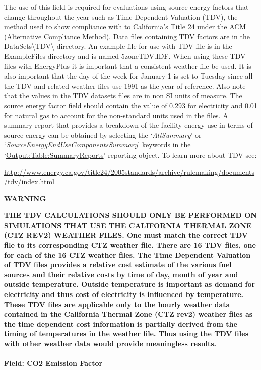 The use of this field is required for evaluations using source energy factors that change throughout the year such as Time Dependent Valuation (TDV), the method used to show compliance with to California's Title 24 under the ACM (Alternative Compliance Method). Data files containing TDV factors are in the DataSets\textbackslash{}TDV\textbackslash{} directory. An example file for use with TDV file is in the ExampleFiles directory and is named 5zoneTDV.IDF. When using these TDV files with EnergyPlus it is important that a consistent weather file be used. It is also important that the day of the week for January 1 is set to Tuesday since all the TDV and related weather files use 1991 as the year of reference. Also note that the values in the TDV datasets files are in non SI units of measure. The source energy factor field should contain the value of 0.293 for electricity and 0.01 for natural gas to account for the non-standard units used in the files. A summary report that provides a breakdown of the facility energy use in terms of source energy can be obtained by selecting the `\emph{AllSummary}' or `\emph{SourceEnergyEndUseComponentsSummary}' keywords in the `\hyperref[outputtablesummaryreports]{Output:Table:SummaryReports}' reporting object. To learn more about TDV see:

\url{http://www.energy.ca.gov/title24/2005standards/archive/rulemaking/documents/tdv/index.html}

\textbf{WARNING}

\textbf{THE TDV CALCULATIONS SHOULD ONLY BE PERFORMED ON SIMULATIONS THAT USE THE CALIFORNIA THERMAL ZONE (CTZ REV2) WEATHER FILES. One must match the correct TDV file to its corresponding CTZ weather file. There are 16 TDV files, one for each of the 16 CTZ weather files. The Time Dependent Valuation of TDV files provides a relative cost estimate of the various fuel sources and their relative costs by time of day, month of year and outside temperature. Outside temperature is important as demand for electricity and thus cost of electricity is influenced by temperature. These TDV files are applicable only to the hourly weather data contained in the California Thermal Zone (CTZ rev2) weather files as the time dependent cost information is partially derived from the timing of temperatures in the weather file. Thus using the TDV files with other weather data would provide meaningless results.}

\paragraph{Field: CO2 Emission Factor}\label{field-co2-emission-factor}

